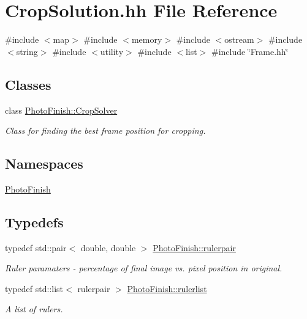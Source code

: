 \hypertarget{_crop_solution_8hh}{}\section{Crop\+Solution.\+hh File Reference}
\label{_crop_solution_8hh}
{\ttfamily \#include $<$map$>$}\newline
{\ttfamily \#include $<$memory$>$}\newline
{\ttfamily \#include $<$ostream$>$}\newline
{\ttfamily \#include $<$string$>$}\newline
{\ttfamily \#include $<$utility$>$}\newline
{\ttfamily \#include $<$list$>$}\newline
{\ttfamily \#include \char`\"{}Frame.\+hh\char`\"{}}\newline
\subsection*{Classes}
\begin{DoxyCompactItemize}
\item 
class \hyperlink{class_photo_finish_1_1_crop_solver}{Photo\+Finish\+::\+Crop\+Solver}
\begin{DoxyCompactList}\small\item\em Class for finding the best frame position for cropping. \end{DoxyCompactList}\end{DoxyCompactItemize}
\subsection*{Namespaces}
\begin{DoxyCompactItemize}
\item 
 \hyperlink{namespace_photo_finish}{Photo\+Finish}
\end{DoxyCompactItemize}
\subsection*{Typedefs}
\begin{DoxyCompactItemize}
\item 
typedef std\+::pair$<$ double, double $>$ \hyperlink{namespace_photo_finish_aa05cab28f1c88a992ff7c1e36fbe9a74}{Photo\+Finish\+::rulerpair}
\begin{DoxyCompactList}\small\item\em Ruler paramaters -\/ percentage of final image vs. pixel position in original. \end{DoxyCompactList}\item 
typedef std\+::list$<$ rulerpair $>$ \hyperlink{namespace_photo_finish_a0abe5e95cf4de0f8f86aeabcf037082b}{Photo\+Finish\+::rulerlist}
\begin{DoxyCompactList}\small\item\em A list of rulers. \end{DoxyCompactList}\end{DoxyCompactItemize}

